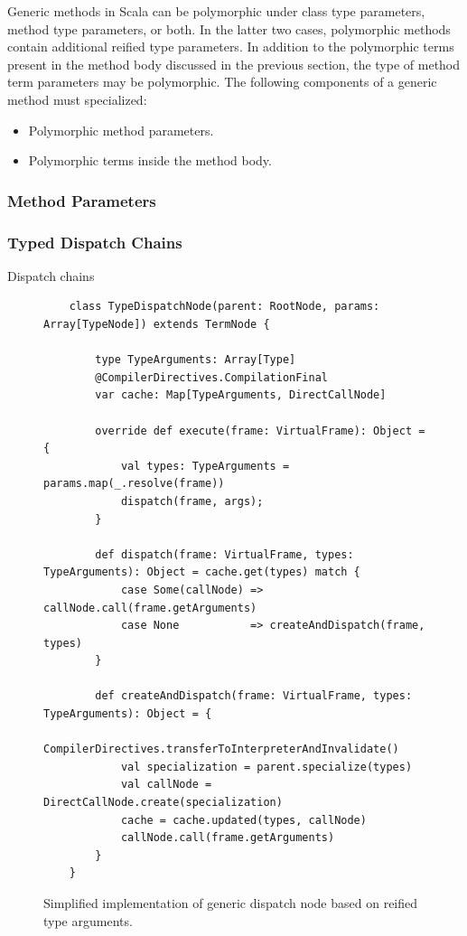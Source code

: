 Generic methods in Scala can be polymorphic under class type parameters, method type parameters, or both. 
In the latter two cases, polymorphic methods contain additional reified type parameters. 
In addition to the polymorphic terms present in the method body discussed in the previous section, the type of method term parameters may be polymorphic. 
The following components of a generic method must specialized:

\begin{itemize}
	\item Polymorphic method parameters.
	\item Polymorphic terms inside the method body.
\end{itemize}


\subsubsection*{Method Parameters}

\subsubsection*{Typed Dispatch Chains}

Dispatch chains\cite{???}

\begin{figure}[!htb]
	\begin{verbatim}
	class TypeDispatchNode(parent: RootNode, params: Array[TypeNode]) extends TermNode {
		
		type TypeArguments: Array[Type]
		@CompilerDirectives.CompilationFinal
		var cache: Map[TypeArguments, DirectCallNode]
		
		override def execute(frame: VirtualFrame): Object = {
			val types: TypeArguments = params.map(_.resolve(frame))
			dispatch(frame, args);
		}
		
		def dispatch(frame: VirtualFrame, types: TypeArguments): Object = cache.get(types) match {
			case Some(callNode) => callNode.call(frame.getArguments)
			case None           => createAndDispatch(frame, types)
		}
		
		def createAndDispatch(frame: VirtualFrame, types: TypeArguments): Object = {
			CompilerDirectives.transferToInterpreterAndInvalidate()
			val specialization = parent.specialize(types)
			val callNode = DirectCallNode.create(specialization)
			cache = cache.updated(types, callNode)
			callNode.call(frame.getArguments)
		}
	}
	\end{verbatim}
\caption{Simplified implementation of generic dispatch node based on reified type arguments.}
\end{figure}

